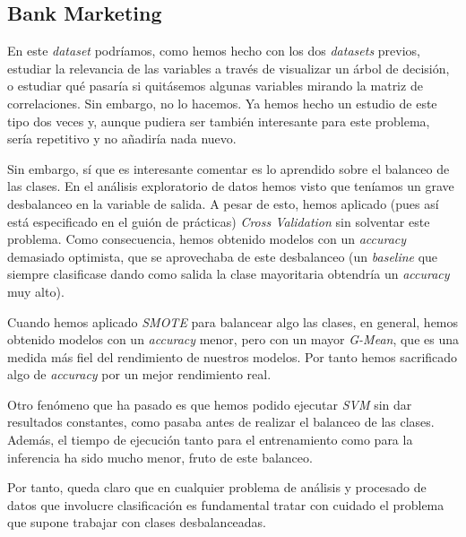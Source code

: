\documentclass[11pt]{article}
\begin{document}
\pagebreak

\subsection{Bank Marketing}

En este \emph{dataset} podríamos, como hemos hecho con los dos \emph{datasets} previos, estudiar la relevancia de las variables a través de visualizar un árbol de decisión, o estudiar qué pasaría si quitásemos algunas variables mirando la matriz de correlaciones. Sin embargo, no lo hacemos. Ya hemos hecho un estudio de este tipo dos veces y, aunque pudiera ser también interesante para este problema, sería repetitivo y no añadiría nada nuevo.

Sin embargo, sí que es interesante comentar es lo aprendido sobre el balanceo de las clases. En el análisis exploratorio de datos hemos visto que teníamos un grave desbalanceo en la variable de salida. A pesar de esto, hemos aplicado (pues así está especificado en el guión de prácticas) \emph{Cross Validation} sin solventar este problema. Como consecuencia, hemos obtenido modelos con un \emph{accuracy} demasiado optimista, que se aprovechaba de este desbalanceo (un \emph{baseline} que siempre clasificase dando como salida la clase mayoritaria obtendría un \emph{accuracy} muy alto).

Cuando hemos aplicado \emph{SMOTE} para balancear algo las clases, en general, hemos obtenido modelos con un \emph{accuracy} menor, pero con un mayor \emph{G-Mean}, que es una medida más fiel del rendimiento de nuestros modelos. Por tanto hemos sacrificado algo de \emph{accuracy} por un mejor rendimiento real.

Otro fenómeno que ha pasado es que hemos podido ejecutar \emph{SVM} sin dar resultados constantes, como pasaba antes de realizar el balanceo de las clases. Además, el tiempo de ejecución tanto para el entrenamiento como para la inferencia ha sido mucho menor, fruto de este balanceo.

Por tanto, queda claro que en cualquier problema de análisis y procesado de datos que involucre clasificación es fundamental tratar con cuidado el problema que supone trabajar con clases desbalanceadas.

\pagebreak



\end{document}

